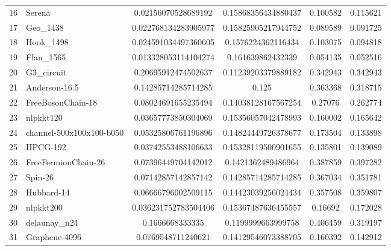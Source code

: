 \begin{tabular}{|l|l|S[round-mode=places,round-precision=4]|S[round-mode=places,round-precision=4]|S[round-mode=places,round-precision=4]|S[round-mode=places,round-precision=4]|}
{16}& {	Serena                    }	& 0.02156070528689192	& 0.15868356434880437	& 0.100582	& 0.115621	\\
{17}& {	Geo\_1438                  }	& 0.022768134283905977	& 0.15825905217944752	& 0.089589	& 0.091725	\\
{18}& {	Hook\_1498                 }	& 0.024591034497360605	& 0.1576224362116434	& 0.103075	& 0.094818	\\
{19}& {	Flan\_1565                 }	& 0.013328053114104274	& 0.161639862432339	& 0.054135	& 0.052516	\\
{20}& {	G3\_circuit                }	& 0.20695912474502637	& 0.11239203379889182	& 0.342943	& 0.342943	\\
{21}& {	Anderson-16.5             }	& 0.14285714285714285	& 0.125	& 0.363368	& 0.318715	\\
{22}& {	FreeBosonChain-18         }	& 0.08024691655235494	& 0.14038128167567254	& 0.27076	& 0.262774	\\
{23}& {	nlpkkt120                 }	& 0.03657773850304069	& 0.15356057042478993	& 0.160002	& 0.165642	\\
{24}& {	channel-500x100x100-b050  }	& 0.05325806761196896	& 0.14824449726378677	& 0.173504	& 0.133898	\\
{25}& {	HPCG-192                  }	& 0.03742553488106633	& 0.15328119500901655	& 0.135801	& 0.139089	\\
{26}& {	FreeFermionChain-26       }	& 0.07396449704142012	& 0.1421362489486964	& 0.387859	& 0.397282	\\
{27}& {	Spin-26                   }	& 0.07142857142857142	& 0.14285714285714285	& 0.367034	& 0.351781	\\
{28}& {	Hubbard-14                }	& 0.06666796002509115	& 0.14423039256024434	& 0.357508	& 0.359807	\\
{29}& {	nlpkkt200                 }	& 0.036231752783504406	& 0.15367487636455557	& 0.16692	& 0.172028	\\
{30}& {	delaunay\_n24              }	& 0.1666668333335	& 0.1199999663999758	& 0.406459	& 0.319197	\\
{31}& {	Graphene-4096             }	& 0.0769548711240621	& 0.14129546073388705	& 0.160392	& 0.142912	\\
\bottomrule
\end{tabular}


